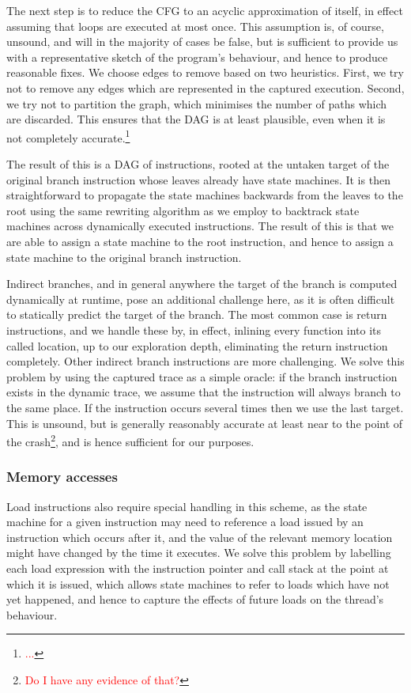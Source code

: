 \documentclass[10pt,twocolumn,preprint,natbib,authoryear]{sigplanconf}
\newcommand{\editorial}[1]{\textcolor{red}{\footnote{\textcolor{red}{#1}}}}
\begin{document}
The next step is to reduce the CFG to an acyclic approximation of
itself, in effect assuming that loops are executed at most once.  This
assumption is, of course, unsound, and will in the majority of cases
be false, but is sufficient to provide us with a representative sketch
of the program's behaviour, and hence to produce reasonable fixes.  We
choose edges to remove based on two heuristics.  First, we try not to
remove any edges which are represented in the captured execution.
Second, we try not to partition the graph, which minimises the number
of paths which are discarded.  This ensures that the DAG is at least
plausible, even when it is not completely accurate.\editorial{...}

The result of this is a DAG of instructions, rooted at the untaken
target of the original branch instruction whose leaves already have
state machines.  It is then straightforward to propagate the state
machines backwards from the leaves to the root using the same
rewriting algorithm as we employ to backtrack state machines across
dynamically executed instructions.  The result of this is that we are
able to assign a state machine to the root instruction, and hence to
assign a state machine to the original branch instruction.

Indirect branches, and in general anywhere the target of the branch is
computed dynamically at runtime, pose an additional challenge here, as
it is often difficult to statically predict the target of the branch.
The most common case is return instructions, and we handle these by,
in effect, inlining every function into its called location, up to our
exploration depth, eliminating the return instruction completely.
Other indirect branch instructions are more challenging.  We solve
this problem by using the captured trace as a simple oracle: if the
branch instruction exists in the dynamic trace, we assume that the
instruction will always branch to the same place.  If the instruction
occurs several times then we use the last target.  This is unsound,
but is generally reasonably accurate at least near to the point of the
crash\editorial{Do I have any evidence of that?}, and is hence
sufficient for our purposes.

\subsubsection{Memory accesses}

Load instructions also require special handling in this scheme, as the
state machine for a given instruction may need to reference a load
issued by an instruction which occurs after it, and the value of the
relevant memory location might have changed by the time it executes.
We solve this problem by labelling each load expression with the
instruction pointer and call stack at the point at which it is issued,
which allows state machines to refer to loads which have not yet
happened, and hence to capture the effects of future loads on the
thread's behaviour.
\end{document}

